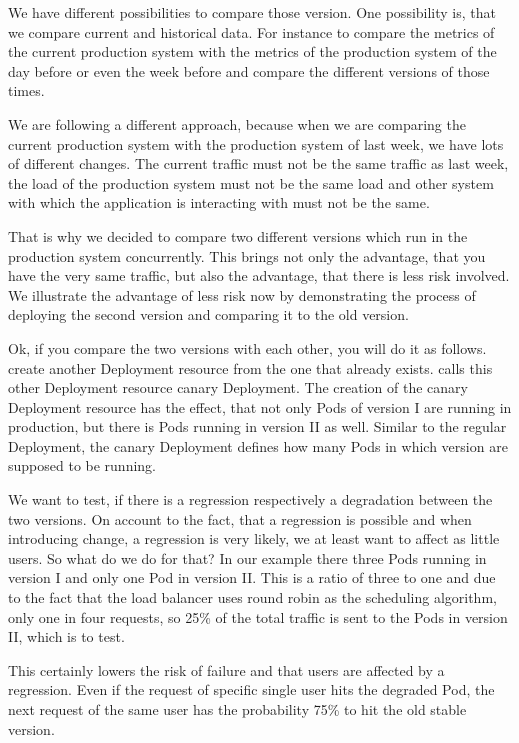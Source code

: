 We have different possibilities to compare those version. One possibility is, that we
compare current and historical data. For instance to compare the metrics of the current
production system with the metrics of the production system of the day before or even the
week before and compare the different versions of those times.

We are following a different approach, because when we are comparing the current
production system with the production system of last week, we have lots of different
changes. The current traffic must not be the same traffic as last week, the load of the
production system must not be the same load and other system with which the application is
interacting with must not be the same.

That is why we decided to compare two different versions which run in the production
system concurrently. This brings not only the advantage, that you have the very same
traffic, but also the advantage, that there is less risk involved. We illustrate the
advantage of less risk now by demonstrating the process of deploying the second version
and comparing it to the old version.

Ok, if you compare the two versions with each other, you will do it as follows. \deployer
create another Deployment resource from the one that already exists. \deployer calls this
other Deployment resource canary Deployment. The creation of the canary Deployment
resource has the effect, that not only Pods of version I are running in production, but
there is Pods running in version II as well. Similar to the regular Deployment, the canary
Deployment defines how many Pods in which version are supposed to be running.

We want to test, if there is a regression respectively a degradation between the two
versions. On account to the fact, that a regression is possible and when introducing
change, a regression is very likely, we at least want to affect as little users. So what
do we do for that? In our example there three Pods running in version I and only one Pod
in version II. This is a ratio of three to one and due to the fact that the load balancer
uses round robin as the scheduling algorithm, only one in four requests, so 25\% of the
total traffic is sent to the Pods in version II, which is to test.

This certainly lowers the risk of failure and that users are affected by a
regression. Even if the request of specific single user hits the degraded Pod, the next
request of the same user has the probability 75\% to hit the old stable version.

